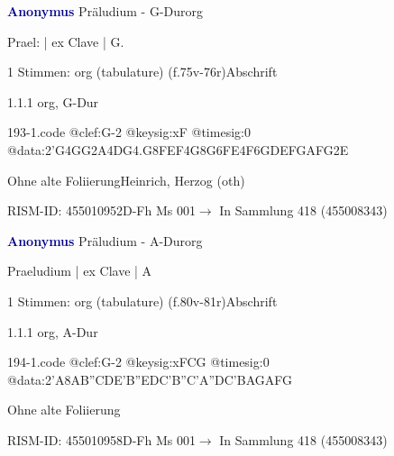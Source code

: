 \documentclass[twocolumn, 12pt]{book}
\begin{document}
\par \vspace{16pt} \textcolor{darkblue}{\textbf{Anonymus  }}\hfillplus{\textbf{[193]}}\newline Präludium - G-Dur\newline org
\par \begin{itshape}[f.75v, at left:] Prael: | ex Clave | G.\end{itshape} 
\par \textcolor{darkblue}{}  1 Stimmen: org (tabulature)  (f.75v-76r)\newline Abschrift
\par 1.1.1  org, G-Dur  
\begin{filecontents*}{193-1.code}
@clef:G-2
@keysig:xF
@timesig:0
@data:2'G4GG2A4DG4.G8F{EF}4G{8G6FE}4F{6GDEF}{GAFG}2E
\end{filecontents*}
\newline %
\par Ohne alte Foliierung\newline Heinrich, Herzog  (oth)
\par RISM-ID: 455010952\newline D-Fh  Ms 001\newline $\rightarrow$ In Sammlung 418 (455008343)
      
\par \vspace{16pt} \textcolor{darkblue}{\textbf{Anonymus  }}\hfillplus{\textbf{[194]}}\newline Präludium - A-Dur\newline org
\par \begin{itshape}[f.81r, at left:] Praeludium | ex Clave | A\end{itshape} 
\par \textcolor{darkblue}{}  1 Stimmen: org (tabulature)  (f.80v-81r)\newline Abschrift
\par 1.1.1  org, A-Dur  
\begin{filecontents*}{194-1.code}
@clef:G-2
@keysig:xFCG
@timesig:0
@data:2'A{8AB''CD}{E'B''ED}{C'B''C'A}{''DC'BA}{GAFG}
\end{filecontents*}
\newline %
\par Ohne alte Foliierung
\par RISM-ID: 455010958\newline D-Fh  Ms 001\newline $\rightarrow$ In Sammlung 418 (455008343)
      
\end{document}

